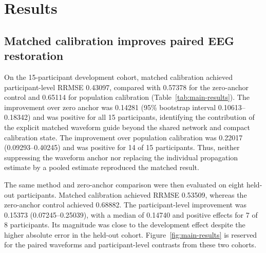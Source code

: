 \section{Results}
\label{sec:results}

\subsection{Matched calibration improves paired EEG restoration}

On the 15-participant development cohort, matched calibration achieved participant-level RRMSE 0.43097, compared with 0.57378 for the zero-anchor control and 0.65114 for population calibration (Table~\ref{tab:main-results}). The improvement over zero anchor was 0.14281 (95\% bootstrap interval 0.10613--0.18342) and was positive for all 15 participants, identifying the contribution of the explicit matched waveform guide beyond the shared network and compact calibration state. The improvement over population calibration was 0.22017 (0.09293--0.40245) and was positive for 14 of 15 participants. Thus, neither suppressing the waveform anchor nor replacing the individual propagation estimate by a pooled estimate reproduced the matched result.

The same method and zero-anchor comparison were then evaluated on eight held-out participants. Matched calibration achieved RRMSE 0.53509, whereas the zero-anchor control achieved 0.68882. The participant-level improvement was 0.15373 (0.07245--0.25039), with a median of 0.14740 and positive effects for 7 of 8 participants. Its magnitude was close to the development effect despite the higher absolute error in the held-out cohort. Figure~\ref{fig:main-results} is reserved for the paired waveforms and participant-level contrasts from these two cohorts.

